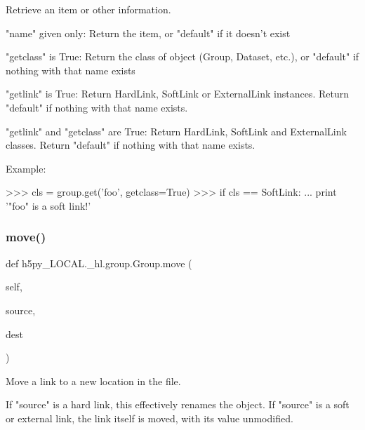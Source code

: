 \begin{DoxyVerb}Retrieve an item or other information.

"name" given only:
    Return the item, or "default" if it doesn't exist

"getclass" is True:
    Return the class of object (Group, Dataset, etc.), or "default"
    if nothing with that name exists

"getlink" is True:
    Return HardLink, SoftLink or ExternalLink instances.  Return
    "default" if nothing with that name exists.

"getlink" and "getclass" are True:
    Return HardLink, SoftLink and ExternalLink classes.  Return
    "default" if nothing with that name exists.

Example:

>>> cls = group.get('foo', getclass=True)
>>> if cls == SoftLink:
...     print '"foo" is a soft link!'
\end{DoxyVerb}
 \mbox{\label{classh5py__LOCAL_1_1__hl_1_1group_1_1Group_a973210ac5339210ea1b4ef3c44f0388b}} 
\subsubsection{\texorpdfstring{move()}{move()}}
{\footnotesize\ttfamily def h5py\+\_\+\+L\+O\+C\+A\+L.\+\_\+hl.\+group.\+Group.\+move (\begin{DoxyParamCaption}\item[{}]{self,  }\item[{}]{source,  }\item[{}]{dest }\end{DoxyParamCaption})}

\begin{DoxyVerb}Move a link to a new location in the file.

If "source" is a hard link, this effectively renames the object.  If
"source" is a soft or external link, the link itself is moved, with its
value unmodified.
\end{DoxyVerb}
 \mbox{\label{classh5py__LOCAL_1_1__hl_1_1group_1_1Group_aaf02f11ac94a9ccd6aa1711b614e7e76}} 
